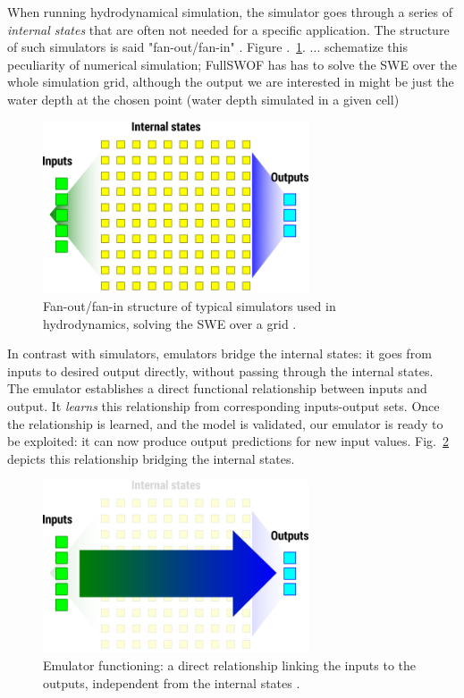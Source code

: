 When running hydrodynamical simulation, the simulator goes through a series of \emph{internal states} that are often not needed for a specific application. The structure of such simulators is said "fan-out/fan-in" \autocite{carbajal_emumore_2017}.
Figure .~\ref{fig:simulation}. ... schematize this peculiarity of numerical simulation; FullSWOF has has to solve the SWE over the whole simulation grid, although the output we are interested in might be just the water depth at the chosen point (water depth simulated in a given cell)

\begin{figure}[h]
  \centering
  \includegraphics[width=0.7\textwidth]{Figures/simulation.png}
  \caption{Fan-out/fan-in structure of typical simulators used in hydrodynamics, solving the SWE over a grid \autocite{carbajal_emumore_2017}.}
  \label{fig:simulation}
\end{figure}

In contrast with simulators, emulators bridge the internal states: it goes from inputs to desired output directly, without passing through the internal states.
The emulator establishes a direct functional relationship between inputs and output.
It \emph{learns} this relationship from corresponding inputs-output sets.
Once the relationship is learned, and the model is validated, our emulator is ready to be exploited: it can now produce output predictions for new input values.
Fig.~\ref{fig:emulation} depicts this relationship bridging the internal states.

\begin{figure}[h]
  \centering
  \includegraphics[width=0.7\textwidth]{Figures/emulation.png}
  \caption{Emulator functioning: a direct relationship linking the inputs to the outputs, independent from the internal states \autocite{carbajal_emumore_2017}.}
  \label{fig:emulation}
\end{figure}

